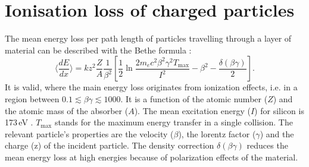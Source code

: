 \section{Ionisation loss of charged particles}
\label{sec:sub:MeasuringDeDx}
The mean energy loss per path length of particles travelling through a layer of material can be described with the Bethe formula \cite{bib:Bethe_1930}:
\begin{equation*}
\langle \frac{dE}{dx} \rangle = kz^2\frac{Z}{A}\frac{1}{\beta^2} [ \frac{1}{2} \ln{\frac{2m_e c^2 \beta^2 \gamma^2 T_{\text{max}}}{I^2}} - \beta^2 - \frac{\delta( \beta \gamma )}{2} ].
\end{equation*}
It is valid, where the main energy loss originates from ionization effects, i.e. in a region between $0.1\lesssim\beta\gamma\lesssim 1000$.
It is a function of the atomic number ($Z$) and the atomic mass of the absorber ($A$). 
The mean excitation energy ($I$) for silicon is 173\,eV \cite{bib:NIST}. 
$T_{\text{max}}$ stands for the maximum energy transfer in a single collision.
The relevant particle's properties are the velocity ($\beta$), the lorentz factor ($\gamma$) and the charge (z) of the incident particle.
The density correction $\delta( \beta \gamma )$ reduces the mean energy loss at high energies because of polarization effects of the material.


